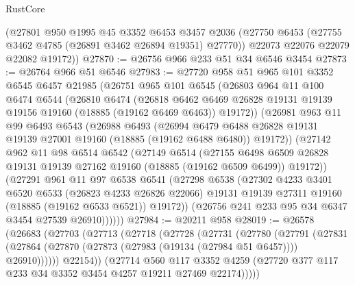 \begin{lexlean}{RustCore}
\begin{coremodule}
      (@27801
        @950
        @1995
        @45
        @3352
        @6453
        @3457
        @2036
        (@27750 @6453 (@27755 @3462 @4785 (@26891 @3462 @26894 @19351) @27770))
        @22073
        @22076
        @22079
        @22082
        @19172))
@27870 := @26756 @966 @233 @51 @34 @6546 @3454
@27873 := @26764 @966 @51 @6546
@27983 := @27720
    @958
    @51
    @965
    @101
    @3352
    @6545
    @6457
    @21985
    (@26751
      @965
      @101
      @6545
      (@26803
        @964
        @11
        @100
        @6474
        @6544
        (@26810
          @6474
          (@26818
            @6462
            @6469
            @26828
            @19131
            @19139
            @19156
            @19160
            (@18885 (@19162 @6469 @6463))
            @19172))
        (@26981
          @963
          @11
          @99
          @6493
          @6543
          (@26988
            @6493
            (@26994
              @6479
              @6488
              @26828
              @19131
              @19139
              @27001
              @19160
              (@18885 (@19162 @6488 @6480))
              @19172))
          (@27142
            @962
            @11
            @98
            @6514
            @6542
            (@27149
              @6514
              (@27155
                @6498
                @6509
                @26828
                @19131
                @19139
                @27162
                @19160
                (@18885 (@19162 @6509 @6499))
                @19172))
            (@27291
              @961
              @11
              @97
              @6538
              @6541
              (@27298
                @6538
                (@27302
                  @4233
                  @3401
                  @6520
                  @6533
                  (@26823 @4233 @26826 @22066)
                  @19131
                  @19139
                  @27311
                  @19160
                  (@18885 (@19162 @6533 @6521))
                  @19172))
              (@26756 @241 @233 @95 @34 @6347 @3454 @27539 @26910))))))
@27984 := @20211 @958
@28019 := @26578
    (@26683
      (@27703
        (@27713
          (@27718
            (@27728
              (@27731
                (@27780
                  (@27791
                    (@27831
                      (@27864 (@27870 (@27873 (@27983 (@19134 (@27984 @51 @6457)))) @26910))))))
              @22154))
          (@27714
            @560
            @117
            @3352
            @4259
            (@27720 @377 @117 @233 @34 @3352 @3454 @4257 @19211 @27469 @22174)))))

\end{coremodule}
\end{lexlean}
